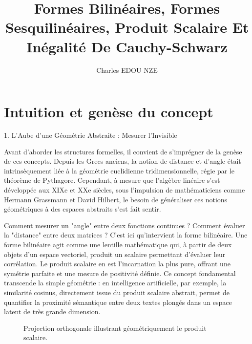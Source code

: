 \documentclass[11pt,a4paper]{report}
\title{Formes Bilinéaires, Formes Sesquilinéaires, Produit Scalaire Et Inégalité De Cauchy-Schwarz}
\author{Charles EDOU NZE}
\date{}
\begin{document}
\maketitle
\tableofcontents
\newpage

\chapter{Intuition et genèse du concept}

1. L'Aube d'une Géométrie Abstraite : Mesurer l'Invisible

Avant d'aborder les structures formelles, il convient de s'imprégner de la genèse de ces concepts. Depuis les Grecs anciens, la notion de distance et d'angle était intrinsèquement liée à la géométrie euclidienne tridimensionnelle, régie par le théorème de Pythagore. Cependant, à mesure que l'algèbre linéaire s'est développée aux XIXe et XXe siècles, sous l'impulsion de mathématiciens comme Hermann Grassmann et David Hilbert, le besoin de généraliser ces notions géométriques à des espaces abstraits s'est fait sentir.

Comment mesurer un "angle" entre deux fonctions continues ? Comment évaluer la "distance" entre deux matrices ? C'est ici qu'intervient la forme bilinéaire. Une forme bilinéaire agit comme une lentille mathématique qui, à partir de deux objets d'un espace vectoriel, produit un scalaire permettant d'évaluer leur corrélation. Le produit scalaire en est l'incarnation la plus pure, offrant une symétrie parfaite et une mesure de positivité définie. Ce concept fondamental transcende la simple géométrie : en intelligence artificielle, par exemple, la similarité cosinus, directement issue du produit scalaire abstrait, permet de quantifier la proximité sémantique entre deux textes plongés dans un espace latent de très grande dimension.



\begin{figure}[h]
\centering
{}
\caption{Projection orthogonale illustrant géométriquement le produit scalaire.}
\end{figure}
\end{document}
